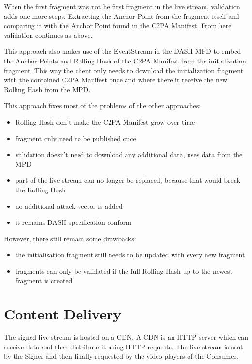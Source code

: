 When the first fragment was not he first fragment in the live stream, validation adds one more steps. Extracting the Anchor Point from the fragment itself and comparing it with the Anchor Point found in the C2PA Manifest. From here validation continues as above.

This approach also makes use of the EventStream in the DASH MPD to embed the Anchor Points and Rolling Hash of the C2PA Manifest from the initialization fragment. This way the client only needs to download the initialization fragment with the contained C2PA Manifest once and where there it receive the new Rolling Hash from the MPD.

This approach fixes most of the problems of the other approaches:

\begin{itemize}
    \item Rolling Hash don't make the C2PA Manifest grow over time
    \item fragment only need to be published once
    \item validation doesn't need to download any additional data, uses data from the MPD
    \item part of the live stream can no longer be replaced, because that would break the Rolling Hash
    \item no additional attack vector is added
    \item it remains DASH specification conform 
\end{itemize}

However, there still remain some drawbacks:

\begin{itemize}
    \item the initialization fragment still needs to be updated with every new fragment
    \item fragments can only be validated if the full Rolling Hash up to the newest fragment is created
\end{itemize}

\section{Content Delivery\label{sec:cdn}}

The signed live stream is hosted on a CDN. A CDN is an HTTP server which can receive data and then distribute it using HTTP requests. The live stream is sent by the Signer and then finally requested by the video players of the Consumer.

